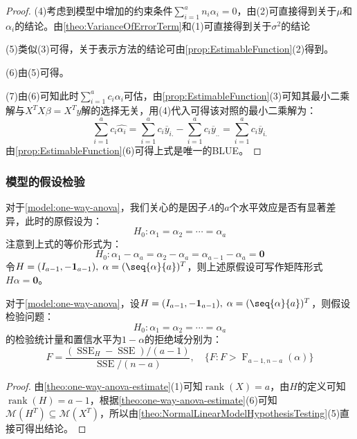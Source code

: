 \begin{proof}
	(4)考虑到模型中增加的约束条件$\sum\limits_{i=1}^{a}n_i\alpha_i=0$，由(2)可直接得到关于$\mu$和$\alpha_i$的结论。由\cref{theo:VarianceOfErrorTerm}和(1)可直接得到关于$\sigma^2$的结论\par
	(5)类似(3)可得，关于表示方法的结论可由\cref{prop:EstimableFunction}(2)得到。\par
	(6)由(5)可得。\par
	(7)由(6)可知此时$\sum\limits_{i=1}^{a}c_i\alpha_i$可估，由\cref{prop:EstimableFunction}(3)可知其最小二乘解与$X^TX\beta=X^Ty$解的选择无关，用(4)代入可得该对照的最小二乘解为：
	\begin{equation*}
		\sum_{i=1}^{a}c_i\hat{\alpha_i}=\sum_{i=1}^{a}c_i\overline{y}_{i.}-\sum_{i=1}^{a}c_i\overline{y}_{..}=\sum_{i=1}^{a}c_i\overline{y}_{i.}
	\end{equation*}
	由\cref{prop:EstimableFunction}(6)可得上式是唯一的BLUE。
\end{proof}

\subsubsection{模型的假设检验}
\begin{note}
	对于\cref{model:one-way-anova}，我们关心的是因子$A$的$a$个水平效应是否有显著差异，此时的原假设为：
	\begin{equation*}
		H_0:\alpha_1=\alpha_2=\cdots=\alpha_a
	\end{equation*}
	注意到上式的等价形式为：
	\begin{equation*}
		H_0:\alpha_1-\alpha_a=\alpha_2-\alpha_a=\alpha_{a-1}-\alpha_a=\mathbf{0}
	\end{equation*}
	令$H=(I_{a-1},-\mathbf{1}_{a-1}),\;\alpha=(\seq{\alpha}{a})^T$，则上述原假设可写作矩阵形式$H\alpha=\mathbf{0}$。
\end{note}
\begin{theorem}\label{theo:AOVHypothesisTesting}
	对于\cref{model:one-way-anova}，设$H=(I_{a-1},-\mathbf{1}_{a-1}),\;\alpha=(\seq{\alpha}{a})^T$，则假设检验问题：
	\begin{equation*}
		H_0:\alpha_1=\alpha_2=\cdots=\alpha_a
	\end{equation*}
	的检验统计量和置信水平为$1-\alpha$的拒绝域分别为：
	\begin{equation*}
		F=\frac{(\operatorname{SSE}_H-\operatorname{SSE})/(a-1)}{\operatorname{SSE}/(n-a)},\quad\{F:F>\operatorname{F}_{a-1,n-a}(\alpha)\}
	\end{equation*}
\end{theorem}
\begin{proof}
	由\cref{theo:one-way-anova-estimate}(1)可知$\operatorname{rank}(X)=a$，由$H$的定义可知$\operatorname{rank}(H)=a-1$，根据\cref{theo:one-way-anova-estimate}(6)可知$\mathcal{M}(H^T)\subseteq\mathcal{M}(X^T)$，所以由\cref{theo:NormalLinearModelHypothesisTesting}(5)直接可得出结论。
\end{proof}
